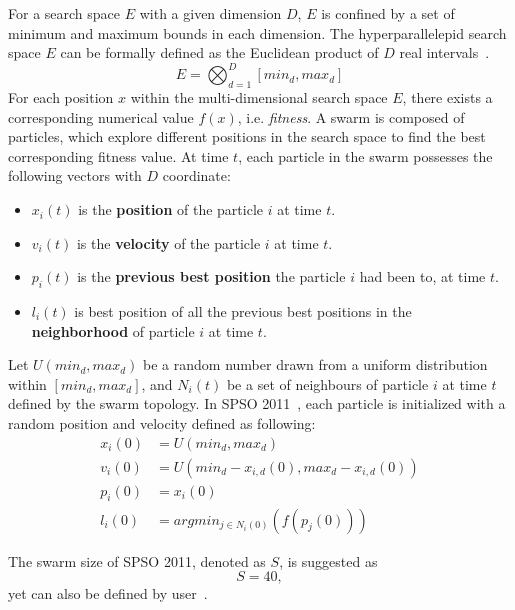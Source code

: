 For a search space $E$ with a given dimension $D$, $E$ is confined by a set of minimum and maximum bounds in each dimension.
The hyperparallelepid search space $E$ can be formally defined as the Euclidean product of $D$ real intervals~\cite{Clerc:2012:SPSO2011}.
\begin{displaymath}
E = \bigotimes_{d=1}^{D}[min_d, max_d]
\end{displaymath}
For each position $x$ within the multi-dimensional search space $E$, there exists a corresponding numerical value $f(x)$, i.e. \textit{fitness}.
A swarm is composed of particles, which explore different positions in the search space to find the best corresponding fitness value.
At time $t$, each particle in the swarm possesses the following vectors with $D$ coordinate:
\begin{itemize}
\item $x_i(t)$ is the \textbf{position} of the particle $i$ at time $t$.
\item $v_i(t)$ is the \textbf{velocity} of the particle $i$ at time $t$.
\item $p_i(t)$ is the \textbf{previous best position} the particle $i$ had been to, at time $t$.
\item $l_i(t)$ is best position of all the previous best positions in the \textbf{neighborhood} of particle $i$ at time $t$.
\end{itemize}

Let $U(min_d, max_d)$ be a random number drawn from a uniform distribution within $[min_d, max_d]$, 
and $N_i(t)$ be a set of neighbours of particle $i$ at time $t$ defined by the swarm topology.
In SPSO 2011~\cite{Clerc:2012:SPSO2011}, each particle is initialized with a random position and velocity defined as following:
\begin{align*}
x_i(0) &= U(min_d, max_d) \\
v_i(0) &= U(min_d - x_{i,d}(0), max_d - x_{i,d}(0)) \\
p_i(0) &= x_i(0) \\ 
l_i(0) &= argmin_{j \in N_i(0)}(f(p_j(0)))
\end{align*}


The swarm size of SPSO 2011, denoted as $S$, is suggested as
\begin{displaymath}
S = 40,
\end{displaymath}
yet can also be defined by user~\cite{Clerc:2012:SPSO2011}.


